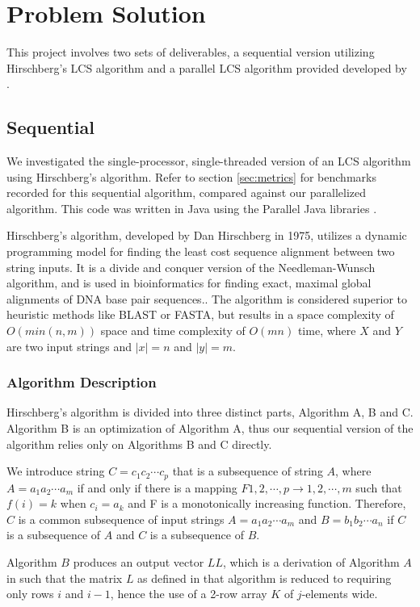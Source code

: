 \section{Problem Solution}
This project involves two sets of deliverables, a sequential version utilizing Hirschberg's LCS algorithm and a parallel LCS algorithm provided developed by \cite{Liu:2007p402}.

\subsection{Sequential}
We investigated the single-processor, single-threaded version of an LCS algorithm using Hirschberg's algorithm\cite{Hirschberg:1975}. Refer to section \ref{sec:metrics} for benchmarks recorded for this sequential algorithm, compared against our parallelized algorithm. This code was written in Java using the Parallel Java libraries \cite{pj}.

Hirschberg's algorithm, developed by Dan Hirschberg in 1975, utilizes a dynamic programming model for finding the least cost sequence alignment between two string inputs. It is a divide and conquer version of the Needleman-Wunsch algorithm, and is used in bioinformatics for finding exact, maximal global alignments of DNA base pair sequences.\cite{wiki-hirsch}. The algorithm is considered superior to heuristic methods like BLAST or FASTA, but results in a space complexity of $O(min(n,m))$ space and time complexity of $O(mn)$ time, where $X$ and $Y$ are two input strings and $|x| = n$ and $|y| = m$.

\subsubsection{Algorithm Description}
Hirschberg's algorithm is divided into three distinct parts, Algorithm A, B and C. Algorithm B is an optimization of Algorithm A, thus our sequential version of the algorithm relies only on Algorithms B and C directly.

We introduce string $C = c_1c_2 \cdots c_p$ that is a subsequence of string $A$, where $A = a_1a_2 \cdots a_m$ if and only if there is a mapping $F{1, 2, \cdots, p} \rightarrow {1,2,\cdots,m}$ such that $f(i) = k$ when $c_i = a_k$ and F is a monotonically increasing function. Therefore, $C$ is a common subsequence of input strings $A = a_1a_2 \cdots a_m$ and $B = b_1b_2 \cdots a_n$ if $C$ is a subsequence of $A$ and $C$ is a subsequence of $B$\cite{Hirschberg:1975}. 

Algorithm $B$ produces an output vector $LL$, which is a derivation of Algorithm $A$ in \cite{Hirschberg:1975} such that the matrix $L$ as defined in that algorithm is reduced to requiring only rows $i$ and $i-1$, hence the use of a 2-row array $K$ of $j$-elements wide.

